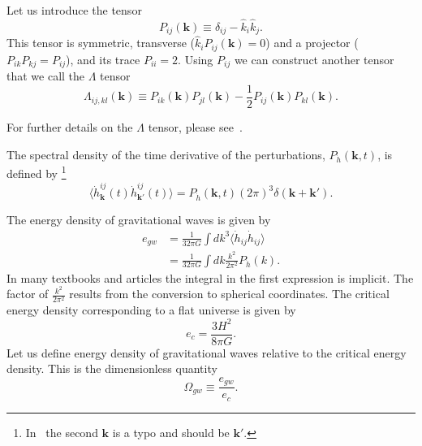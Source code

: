 Let us introduce the tensor
\cite[eq. 1.35]{maggiore_gw_2008}
\begin{equation}
P_{ij}(\bm{k}) \equiv \delta_{ij} - \hat{k}_i \hat{k}_j.
\end{equation}
This tensor is symmetric, transverse ($\hat{k}_i P_{ij}(\bm{k}) = 0$) and a projector ($P_{ik}P_{kj} = P_{ij}$), and its trace $P_{ii} = 2$.
Using $P_{ij}$ we can construct another tensor that we call the $\Lambda$ tensor
\cite[eq. 1.36]{maggiore_gw_2008}
\begin{equation}
\Lambda_{ij,kl}(\bm{k}) \equiv P_{ik}(\bm{k}) P_{jl}(\bm{k}) - \frac{1}{2} P_{ij}(\bm{k}) P_{kl}(\bm{k}).
\label{eq:Lambda}
\end{equation}
\iffalse
This is still a projector, in the sense that
\begin{equation}
\Lambda_{ij,kl} \Lambda_{kl,mn} = \Lambda_{ij,mn}.
\end{equation}
It is also transverse on all of its indices as $n^i \Lambda_{ij,kl} = 0$ for all indices ($ijkl$).
It is traceless with respect to the ($i,j$) and ($k,l$) index pairs,
\begin{equation}
\Lambda_{ii,kl} = \Lambda_{ij,kk} = 0.
\end{equation}
\fi
For further details on the $\Lambda$ tensor, please see~\cite[ch. 1.2]{maggiore_gw_2008}.

The spectral density of the time derivative of the perturbations, $P_{\dot{h}}(\bm{k},t)$, is defined by
\cite[eq. 3.4]{hindmarsh_gw_pt_2019}%
\footnote{In~\cite[eq. 3.4]{hindmarsh_gw_pt_2019} the second $\mathbf{k}$ is a typo and should be $\mathbf{k}'$.}
\begin{equation}
\langle \dot{h}_{\bm{k}}^{ij}(t) \dot{h}_{\bm{k}'}^{ij}(t) \rangle = P_{\dot{h}}(\bm{k},t) (2\pi)^3 \delta (\bm{k} + \bm{k}').
\label{eq:hbracket}
\end{equation}

The energy density of gravitational waves is given by
\cites[eq. 3.3]{hindmarsh_gw_pt_2019}[eq. 1.135, 7.193]{maggiore_gw_2008}
\begin{align}
e_{gw}
&= \frac{1}{32 \pi G} \int dk^3 \langle \dot{h}_{ij} \dot{h}_{ij} \rangle \\
&= \frac{1}{32 \pi G} \int dk \frac{k^2}{2 \pi^2} P_{\dot{h}}(k).
\end{align}
In many textbooks and articles the integral in the first expression is implicit.
The factor of $\frac{k^2}{2\pi^2}$ results from the conversion to spherical coordinates.
The critical energy density corresponding to a flat universe is given by
\cite[eq. 7.196]{maggiore_gw_2008}
\begin{equation}
e_c = \frac{3 H^2}{8 \pi G}.
\label{eq:e_crit}
\end{equation}
Let us define energy density of gravitational waves relative to the critical energy density.
This is the dimensionless quantity
\begin{equation}
\Omega_{gw} \equiv \frac{e_{gw}}{e_c}.
\label{eq:omega_gw}
\end{equation}

